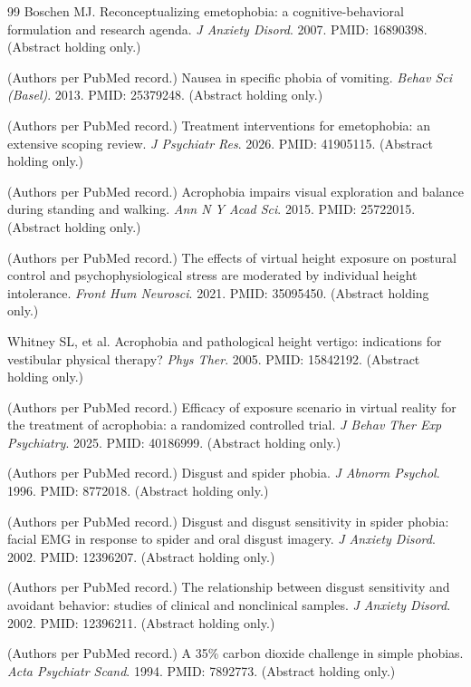 \documentclass[9pt,twocolumn]{article}
\begin{document}
\begin{thebibliography}{99}
Boschen MJ. Reconceptualizing emetophobia: a cognitive-behavioral formulation and research agenda. \emph{J Anxiety Disord}. 2007. PMID: 16890398. (Abstract holding only.)

(Authors per PubMed record.) Nausea in specific phobia of vomiting. \emph{Behav Sci (Basel)}. 2013. PMID: 25379248. (Abstract holding only.)

(Authors per PubMed record.) Treatment interventions for emetophobia: an extensive scoping review. \emph{J Psychiatr Res}. 2026. PMID: 41905115. (Abstract holding only.)

(Authors per PubMed record.) Acrophobia impairs visual exploration and balance during standing and walking. \emph{Ann N Y Acad Sci}. 2015. PMID: 25722015. (Abstract holding only.)

(Authors per PubMed record.) The effects of virtual height exposure on postural control and psychophysiological stress are moderated by individual height intolerance. \emph{Front Hum Neurosci}. 2021. PMID: 35095450. (Abstract holding only.)

Whitney SL, et al. Acrophobia and pathological height vertigo: indications for vestibular physical therapy? \emph{Phys Ther}. 2005. PMID: 15842192. (Abstract holding only.)

(Authors per PubMed record.) Efficacy of exposure scenario in virtual reality for the treatment of acrophobia: a randomized controlled trial. \emph{J Behav Ther Exp Psychiatry}. 2025. PMID: 40186999. (Abstract holding only.)

(Authors per PubMed record.) Disgust and spider phobia. \emph{J Abnorm Psychol}. 1996. PMID: 8772018. (Abstract holding only.)

(Authors per PubMed record.) Disgust and disgust sensitivity in spider phobia: facial EMG in response to spider and oral disgust imagery. \emph{J Anxiety Disord}. 2002. PMID: 12396207. (Abstract holding only.)

(Authors per PubMed record.) The relationship between disgust sensitivity and avoidant behavior: studies of clinical and nonclinical samples. \emph{J Anxiety Disord}. 2002. PMID: 12396211. (Abstract holding only.)

(Authors per PubMed record.) A 35\% carbon dioxide challenge in simple phobias. \emph{Acta Psychiatr Scand}. 1994. PMID: 7892773. (Abstract holding only.)


\end{thebibliography}
\end{document}
